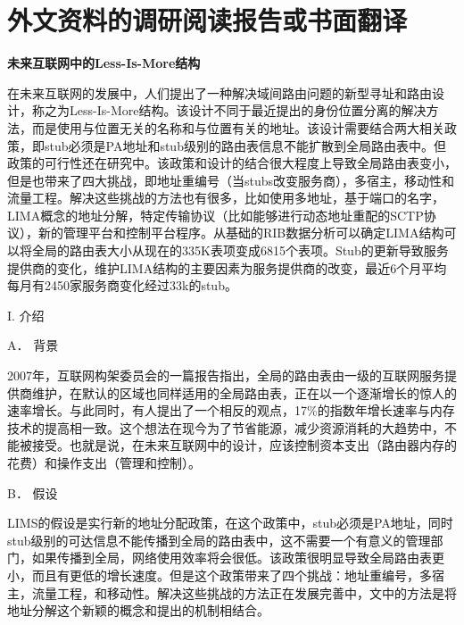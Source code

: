
%


\chapter{外文资料的调研阅读报告或书面翻译}
\begin{center}
\textbf{未来互联网中的Less-Is-More结构\cite{lima}}
\end{center}

在未来互联网的发展中，人们提出了一种解决域间路由问题的新型寻址和路由设计，称之为Less-Is-More结构。该设计不同于最近提出的身份位置分离的解决方法，而是使用与位置无关的名称和与位置有关的地址。该设计需要结合两大相关政策，即stub必须是PA地址和stub级别的路由表信息不能扩散到全局路由表中。但政策的可行性还在研究中。该政策和设计的结合很大程度上导致全局路由表变小，但是也带来了四大挑战，即地址重编号（当stubs改变服务商），多宿主，移动性和流量工程。解决这些挑战的方法也有很多，比如使用多地址，基于端口的名字，LIMA概念的地址分解，特定传输协议（比如能够进行动态地址重配的SCTP协议），新的管理平台和控制平台程序。从基础的RIB数据分析可以确定LIMA结构可以将全局的路由表大小从现在的335K表项变成6815个表项。Stub的更新导致服务提供商的变化，维护LIMA结构的主要因素为服务提供商的改变，最近6个月平均每月有2450家服务商变化经过33k的stub。

\begin{center}
I.	介绍
\end{center}

\begin{flushleft}
A．	背景
\end{flushleft}
\par 2007年，互联网构架委员会的一篇报告指出，全局的路由表由一级的互联网服务提供商维护，在默认的区域也同样适用的全局路由表，正在以一个逐渐增长的惊人的速率增长。与此同时，有人提出了一个相反的观点，17\%的指数年增长速率与内存技术的提高相一致。这个想法在现今为了节省能源，减少资源消耗的大趋势中，不能被接受。也就是说，在未来互联网中的设计，应该控制资本支出（路由器内存的花费）和操作支出（管理和控制）。


\begin{flushleft}
B．	假设
\end{flushleft}
\par LIMS的假设是实行新的地址分配政策，在这个政策中，stub必须是PA地址，同时stub级别的可达信息不能传播到全局的路由表中，这不需要一个有意义的管理部门，如果传播到全局，网络使用效率将会很低。该政策很明显导致全局路由表更小，而且有更低的增长速度。但是这个政策带来了四个挑战：地址重编号，多宿主，流量工程，和移动性。解决这些挑战的方法正在发展完善中，文中的方法是将地址分解这个新颖的概念和提出的机制相结合。

